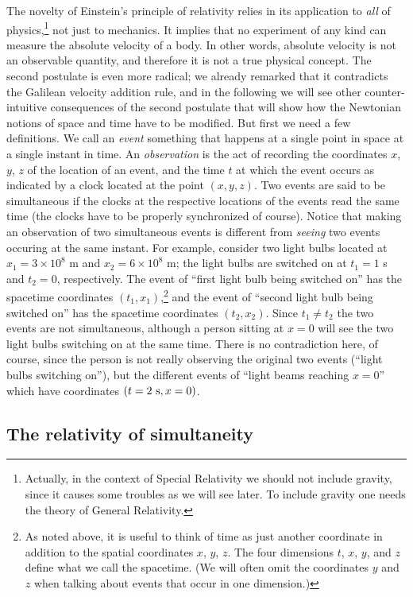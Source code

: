\documentclass[11pt, a4paper,oneside,openright]{book}
\numberwithin{equation}{section}
\begin{document}
The novelty of Einstein's principle of relativity relies in its application to {\it all} of physics,\footnote{Actually, in the context of Special Relativity we should not include gravity, since it causes some troubles as we will see later. To include gravity one needs the theory of General Relativity.} not just to mechanics. It implies that no experiment of any kind can measure the absolute velocity of a body. In other words, absolute velocity is not an observable quantity, and therefore it is not a true physical concept. The second postulate is even more radical; we already remarked that it contradicts the Galilean velocity addition rule, and in the following we will see other counter-intuitive consequences of the second postulate that will show how the Newtonian notions of space and time have to be modified. But first we need a few definitions. We call an {\it event} something that happens at a single point in space at a single instant in time. An {\it observation} is the act of recording the coordinates 
$x$, $y$, $z$ of the location of an event, and the time $t$ at which the event occurs as indicated by a clock located at the point $(x,y,z)$. Two events are said to be simultaneous if the clocks at the respective locations of the events read the same time (the clocks have to be properly synchronized of course). Notice that making an observation of two simultaneous events is different from {\it seeing} two events occuring at the same instant. For example, consider two light bulbs located at $x_1=3\times10^8$ m and $x_2=6\times10^8$ m; the light bulbs are switched on at $t_1=1$ s and $t_2=0$, respectively. The event of ``first light bulb being switched on'' has the spacetime coordinates $(t_1,x_1)$,\footnote{As noted above, it is useful to think of time as just another coordinate in addition to the spatial coordinates $x$, $y$, $z$. The four dimensions $t$, $x$, $y$, and $z$ define what we call the spacetime. (We will often omit the coordinates $y$ and $z$ when talking about events that occur in one dimension.)
} and the event of ``second light bulb being switched on'' has the spacetime coordinates $(t_2,x_2)$. Since $t_1\neq t_2$ the two events are not simultaneous, although a person sitting at $x=0$ will see the two light bulbs switching on at the same time. There is no contradiction here, of course, since the person is not really observing the original two events (``light bulbs switching on''), but the different events of ``light beams reaching $x=0$'' which have coordinates $(t=2~{\rm s},x=0)$.

\subsection{The relativity of simultaneity}
\end{document}
